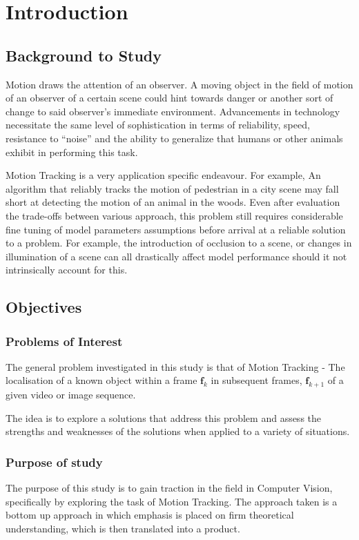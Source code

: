 \chapter{Introduction}

\section{Background to Study}
Motion draws the attention of an observer. A moving object in the field of
motion of an observer of a certain scene could hint towards danger or another
sort of change to said observer's immediate environment. Advancements in
technology necessitate the same level of sophistication in terms of
reliability, speed, resistance to ``noise'' and the ability to generalize that
humans or other animals exhibit in performing this task.

Motion Tracking is a very application specific endeavour. For example, An
algorithm that reliably tracks the motion of pedestrian in a city scene may fall
short at detecting the motion of an animal in the woods. Even after evaluation
the trade-offs between various approach, this problem still requires
considerable fine tuning of model parameters assumptions before arrival at a
reliable solution to a problem.  For example, the introduction of occlusion to a
scene, or changes in illumination of a scene can all drastically affect model
performance should it not intrinsically account for this.

\section{Objectives}\label{introduction_objectives}

\subsection{Problems of Interest}
The general problem investigated in this study is that of Motion Tracking - The
localisation of a known object within a frame $\mathbf{f}_k$ in subsequent
frames, $\mathbf{f}_{k+1}$ of a given video or image sequence.  

The idea is to explore a solutions that address this problem and assess the
strengths and weaknesses of the solutions when applied to a variety of
situations.

\subsection{Purpose of study}
The purpose of this study is to gain traction in the field in Computer Vision,
specifically by exploring the task of Motion Tracking. The approach taken is a
bottom up approach in which emphasis is placed on firm theoretical
understanding, which is then translated into a product.

